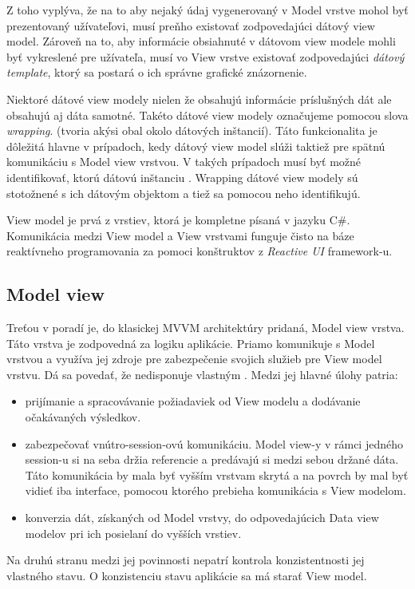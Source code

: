 \begin{itemize}
    Z toho vyplýva, že na to aby nejaký údaj vygenerovaný v Model vrstve mohol byť prezentovaný užívateľovi, musí preňho existovať zodpovedajúci dátový view model. Zároveň na to, aby informácie obsiahnuté v dátovom view modele mohli byť vykreslené pre užívateľa, musí vo View vrstve existovať zodpovedajúci \textit{dátový template}, ktorý sa postará o ich správne grafické znázornenie.

    Niektoré dátové view modely nielen že obsahujú informácie príslušných dát ale obsahujú aj dáta samotné. Takéto dátové view modely označujeme pomocou slova \textit{wrapping}. (tvoria akýsi obal okolo dátových inštancií). Táto funkcionalita je dôležitá hlavne v prípadoch, kedy dátový view model slúži taktiež pre spätnú komunikáciu s Model view vrstvou. V takých prípadoch musí byť možné identifikovať, ktorú dátovú inštanciu . Wrapping dátové view modely sú stotožnené s ich dátovým objektom a tiež sa pomocou neho identifikujú.  
\end{itemize}


View model je prvá z vrstiev, ktorá je kompletne písaná v jazyku C\#. Komunikácia medzi View model a View vrstvami funguje čisto na báze reaktívneho programovania za pomoci konštruktov z \textit{Reactive UI} framework-u.  

\subsection{Model view}

Treťou v poradí je, do klasickej MVVM architektúry pridaná, Model view vrstva. Táto vrstva je zodpovedná za  logiku aplikácie. Priamo komunikuje s Model vrstvou a využíva jej zdroje pre zabezpečenie svojich služieb pre View model vrstvu. Dá sa povedať, že nedisponuje vlastným . Medzi jej hlavné úlohy patria:  
\begin{itemize}
    \item prijímanie a spracovávanie požiadaviek od View modelu a dodávanie očakávaných výsledkov.  
    \item zabezpečovať vnútro-session-ovú komunikáciu. Model view-y v rámci jedného session-u si na seba držia referencie a predávajú si medzi sebou držané dáta. Táto komunikácia by mala byť vyšším vrstvam skrytá a na povrch by mal byť vidieť iba interface, pomocou ktorého prebieha komunikácia s View modelom.
    \item konverzia dát, získaných od Model vrstvy, do odpovedajúcich Data view modelov pri ich posielaní do vyšších vrstiev.  
\end{itemize}
Na druhú stranu medzi jej povinnosti nepatrí kontrola konzistentnosti jej vlastného stavu. O konzistenciu stavu aplikácie sa má starať View model.

